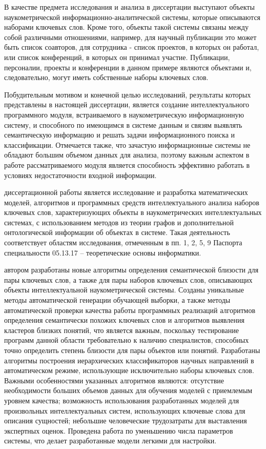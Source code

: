
{\actuality} В качестве предмета исследования и анализа в диссертации выступают объекты наукометрической информационно-аналитической системы, которые описываются наборами ключевых слов. Кроме того, объекты такой системы связаны между собой различными отношениями, например, для научный публикации это может быть список соавторов, для сотрудника - список проектов, в которых он работал, или список конференций, в которых он принимал участие. Публикации, персоналии, проекты и конференции в данном примере являются объектами и, следовательно, могут иметь собственные наборы ключевых слов. 

Побудительным мотивом и конечной целью исследований, результаты которых представлены в настоящей диссертации, является создание интеллектуального программного модуля, встраиваемого в наукометрическую информационную систему, и способного по имеющимся в системе данным и связям выявлять семантическую информацию и решать задачи информационного поиска и классификации. Отмечается также, что зачастую информационные системы не обладают большим объемом данных для анализа, поэтому важным аспектом в работе рассматриваемого модуля является способность эффективно работать в условиях недостаточности входной информации.

{\aim}  диссертационной работы является исследование и разработка математических моделей, алгоритмов и программных средств интеллектуального анализа наборов ключевых слов, характеризующих объекты в наукометрических интеллектуальных системах, с использованием методов из теории графов и дополнительной онтологической информации об объектах в системе. Такая деятельность соответствует областям исследования, отмеченным в пп. 1, 2, 5, 9 Паспорта специальности 05.13.17 – теоретические основы информатики.


{\novelty}
автором разработаны новые алгоритмы определения семантической близости для пары ключевых слов, а также для пары наборов ключевых слов, описывающих объекты интеллектуальной наукометрической системы. Созданы уникальные методы автоматической генерации обучающей выборки, а также методы автоматической проверки качества работы программных реализаций алгоритмов определения семантически похожих ключевых слов и алгоритмов выявления кластеров близких понятий, что является важным, поскольку тестирование программ данной области требовательно к наличию специалистов, способных точно определить степень близости для пары объектов или понятий. Разработаны алгоритмы построения иерархических классификаторов научных направлений в автоматическом режиме, использующие исключительно наборы ключевых слов. Важными особенностями  указанных алгоритмов являются: отсутствие необходимости больших объемов данных для обучения моделей с приемлемым уровнем качества; возможность использования разработанных моделей для произвольных интеллектуальных систем, использующих ключевые слова для описания сущностей; небольшие человеческие трудозатраты для выставления экспертных оценок. Проведена работа по уменьшению числа параметров системы, что делает разработанные модели легкими для настройки.

